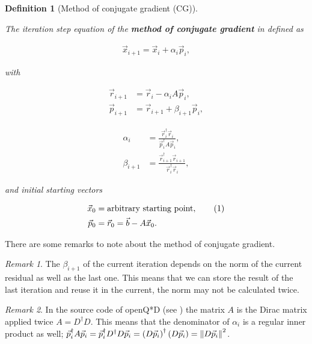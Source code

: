 \documentclass{article}
\newcommand\numberthis{\addtocounter{equation}{1}\tag{\theequation}}
\theoremstyle{plain} %
\newtheorem{definition}{Definition}[section]
\theoremstyle{convention} %
\theoremstyle{remark} %
\newtheorem*{remark}{Remark} %
\def\df#1{\textbf{\textit{#1}}}
\numberwithin{equation}{section}
\begin{document}
\begin{definition}[Method of conjugate gradient (CG)]

\label{def:cg}

The iteration step equation of the \df{method of conjugate gradient} in defined as

\begin{align*}
    \vec{x}_{i+1} = \vec{x}_i + \alpha_i \vec{p}_i,
\end{align*}

with

\noindent\begin{minipage}{.5\linewidth}
    \begin{align*}
        \vec{r}_{i+1} &= \vec{r}_{i}   - \alpha_i A  \vec{p}_i, \\
        \vec{p}_{i+1} &= \vec{r}_{i+1} + \beta_{i+1} \vec{p}_i, 
    \end{align*}
\end{minipage}
\begin{minipage}{.5\linewidth}
    \begin{align}
        \alpha_i    &= \frac{ \vec{r}_{i}^{\dagger} \vec{r}_{i} }{ \vec{p}_i^{\dagger} A \vec{p}_i }, \label{eq:alphai} \\
        \beta_{i+1} &= \frac{ \vec{r}_{i+1}^{\dagger} \vec{r}_{i+1} }{ \vec{r}_{i}^{\dagger} \vec{r}_{i} }, \label{eq:betai}
    \end{align}
\end{minipage}

and initial starting vectors

\begin{align*}
    \vec{x}_{0} &= \text{arbitrary starting point}, \numberthis \label{eq:cg:start} \\
    \vec{p}_{0} &= \vec{r}_{0} = \vec{b} - A \vec{x}_0.
\end{align*}

\end{definition}

There are some remarks to note about the method of conjugate gradient.

\begin{remark}
    The $\beta_{i+1}$ of the current iteration depends on the norm of the current residual as well as the last one. This means that we can store the result of the last iteration and reuse it in the current, the norm may not be calculated twice.
\end{remark}

\begin{remark}
    In the source code of openQ*D (see \cite{openqxd}) the matrix $A$ is the Dirac matrix applied twice $A = D^{\dagger} D$. This means that the denominator of $\alpha_i$ is a regular inner product as well; $\vec{p}_i^{\dagger} A \vec{p}_i = \vec{p}_i^{\dagger} D^{\dagger} D \vec{p}_i = \left( D \vec{p}_i \right)^{\dagger} \left( D \vec{p}_i \right) = \norm{ D \vec{p}_i }^2$.
\end{remark}
\end{document}
